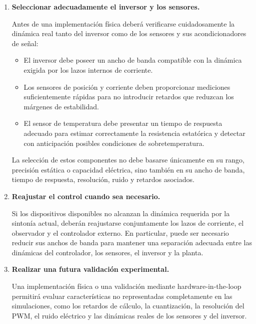 \documentclass[10pt,a4paper]{article}
\begin{document}
\begin{enumerate}
	\item \textbf{Seleccionar adecuadamente el inversor y los sensores.}
	
	Antes de una implementación física deberá verificarse cuidadosamente la
	dinámica real tanto del inversor como de los sensores y sus
	acondicionadores de señal:
	
	\begin{itemize}
		\setlength{\itemsep}{0.35em}
		
		\item El inversor debe poseer un ancho de banda compatible con la
		dinámica exigida por los lazos internos de corriente.
		
		\item Los sensores de posición y corriente deben proporcionar
		mediciones suficientemente rápidas para no introducir retardos que
		reduzcan los márgenes de estabilidad.
		
		\item El sensor de temperatura debe presentar un tiempo de respuesta
		adecuado para estimar correctamente la resistencia estatórica y
		detectar con anticipación posibles condiciones de sobretemperatura.
	\end{itemize}
	
	La selección de estos componentes no debe basarse únicamente en su rango,
	precisión estática o capacidad eléctrica, sino también en su ancho de
	banda, tiempo de respuesta, resolución, ruido y retardos asociados.
	
	\item \textbf{Reajustar el control cuando sea necesario.}
	
	Si los dispositivos disponibles no alcanzan la dinámica requerida por la
	sintonía actual, deberán reajustarse conjuntamente los lazos de corriente,
	el observador y el controlador externo. En particular, puede ser necesario
	reducir sus anchos de banda para mantener una separación adecuada entre las
	dinámicas del controlador, los sensores, el inversor y la planta.
	
	\item \textbf{Realizar una futura validación experimental.}
	
	Una implementación física o una validación mediante
	hardware-in-the-loop permitirá evaluar características no representadas
	completamente en las simulaciones, como los retardos de cálculo, la
	cuantización, la resolución del PWM, el ruido eléctrico y las dinámicas
	reales de los sensores y del inversor.
\end{enumerate}
\end{document}
